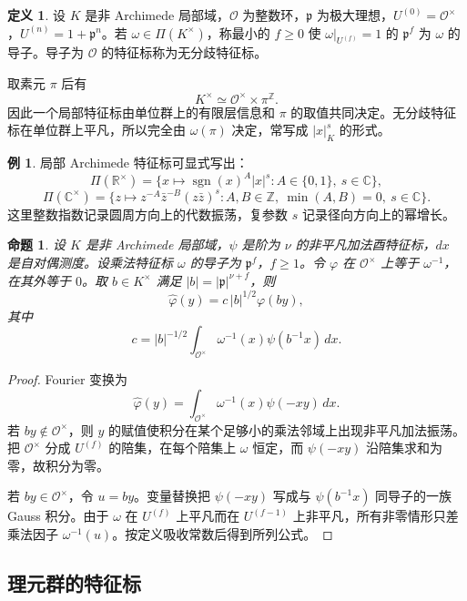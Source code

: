 \documentclass[11pt,a4paper,openany]{ctexbook}
\numberwithin{equation}{chapter}
\newcommand{\R}{\mathbb{R}}
\newcommand{\C}{\mathbb{C}}
\newcommand{\Z}{\mathbb{Z}}
\theoremstyle{plain}
\newtheorem{proposition}[theorem]{命题}
\theoremstyle{definition}
\newtheorem{definition}[theorem]{定义}
\newtheorem{example}[theorem]{例}
\theoremstyle{remark}
\begin{document}
\begin{definition}
设 $K$ 是非 Archimede 局部域，$\mathcal O$ 为整数环，$\mathfrak p$ 为极大理想，$U^{(0)}=\mathcal O^\times$，$U^{(n)}=1+\mathfrak p^n$。若 $\omega\in\Pi(K^\times)$，称最小的 $f\ge0$ 使 $\omega|_{U^{(f)}}=1$ 的 $\mathfrak p^f$ 为 $\omega$ 的导子。导子为 $\mathcal O$ 的特征标称为无分歧特征标。
\end{definition}

取素元 $\pi$ 后有
\[
  K^\times\simeq \mathcal O^\times\times \pi^\Z .
\]
因此一个局部特征标由单位群上的有限层信息和 $\pi$ 的取值共同决定。无分歧特征标在单位群上平凡，所以完全由 $\omega(\pi)$ 决定，常写成 $|x|_K^s$ 的形式。

\begin{example}
局部 Archimede 特征标可显式写出：
\[
  \Pi(\R^\times)=\{x\mapsto \operatorname{sgn}(x)^A |x|^s: A\in\{0,1\},\ s\in\C\},
\]
\[
  \Pi(\C^\times)=\{z\mapsto z^{-A}\bar z^{-B}(z\bar z)^s:
  A,B\in\Z,\ \min(A,B)=0,\ s\in\C\}.
\]
这里整数指数记录圆周方向上的代数振荡，复参数 $s$ 记录径向方向上的幂增长。
\end{example}

\begin{proposition}
设 $K$ 是非 Archimede 局部域，$\psi$ 是阶为 $\nu$ 的非平凡加法酉特征标，$dx$ 是自对偶测度。设乘法特征标 $\omega$ 的导子为 $\mathfrak p^f$，$f\ge1$。令 $\varphi$ 在 $\mathcal O^\times$ 上等于 $\omega^{-1}$，在其外等于 $0$。取 $b\in K^\times$ 满足 $|b|=|\mathfrak p|^{\nu+f}$，则
\[
  \widehat\varphi(y)=c\,|b|^{1/2}\varphi(by),
\]
其中
\[
  c=|b|^{-1/2}\int_{\mathcal O^\times}\omega^{-1}(x)\psi(b^{-1}x)\,dx .
\]
\end{proposition}

\begin{proof}
Fourier 变换为
\[
  \widehat\varphi(y)=\int_{\mathcal O^\times}\omega^{-1}(x)\psi(-xy)\,dx .
\]
若 $by\notin\mathcal O^\times$，则 $y$ 的赋值使积分在某个足够小的乘法邻域上出现非平凡加法振荡。把 $\mathcal O^\times$ 分成 $U^{(f)}$ 的陪集，在每个陪集上 $\omega$ 恒定，而 $\psi(-xy)$ 沿陪集求和为零，故积分为零。

若 $by\in\mathcal O^\times$，令 $u=by$。变量替换把 $\psi(-xy)$ 写成与 $\psi(b^{-1}x)$ 同导子的一族 Gauss 积分。由于 $\omega$ 在 $U^{(f)}$ 上平凡而在 $U^{(f-1)}$ 上非平凡，所有非零情形只差乘法因子 $\omega^{-1}(u)$。按定义吸收常数后得到所列公式。
\end{proof}

\subsection{理元群的特征标}
\end{document}
